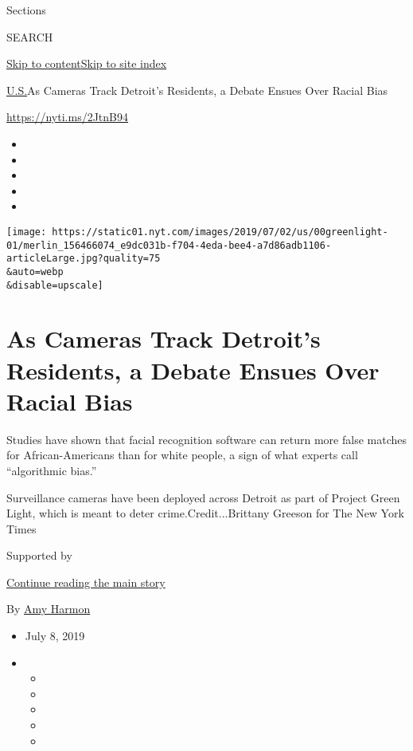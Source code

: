 Sections

SEARCH

\protect\hyperlink{site-content}{Skip to
content}\protect\hyperlink{site-index}{Skip to site index}

\href{/section/us}{U.S.}\textbar{}As Cameras Track Detroit's Residents,
a Debate Ensues Over Racial Bias

\url{https://nyti.ms/2JtnB94}

\begin{itemize}
\item
\item
\item
\item
\item
\end{itemize}

\texttt{[image: https://static01.nyt.com/images/2019/07/02/us/00greenlight-01/merlin\_156466074\_e9dc031b-f704-4eda-bee4-a7d86adb1106-articleLarge.jpg?quality=75\\\&auto=webp\\\&disable=upscale]}

\hypertarget{as-cameras-track-detroits-residents-a-debate-ensues-over-racial-bias}{%
\section{As Cameras Track Detroit's Residents, a Debate Ensues Over
Racial
Bias}\label{as-cameras-track-detroits-residents-a-debate-ensues-over-racial-bias}}

Studies have shown that facial recognition software can return more
false matches for African-Americans than for white people, a sign of
what experts call ``algorithmic bias.''

Surveillance cameras have been deployed across Detroit as part of
Project Green Light, which is meant to deter crime.Credit...Brittany
Greeson for The New York Times

Supported by

\protect\hyperlink{after-sponsor}{Continue reading the main story}

By \href{https://www.nytimes.com/by/amy-harmon}{Amy Harmon}

\begin{itemize}
\item
  July 8, 2019
\item
  \begin{itemize}
  \item
  \item
  \item
  \item
  \item
  \end{itemize}
\end{itemize}


